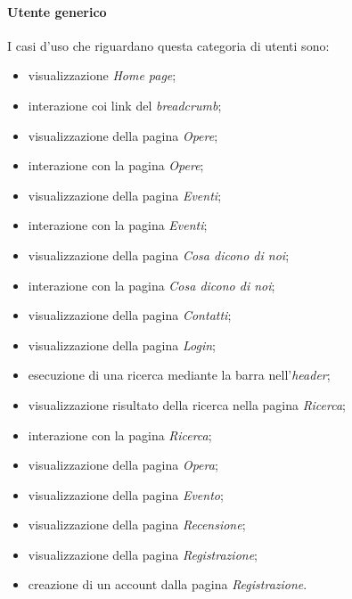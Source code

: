 \paragraph{Utente generico}
\label{analisi-casi-uso-attori-principali-utente-generico}
I casi d'uso che riguardano questa categoria di utenti sono:
\begin{itemize}
	\item visualizzazione \textit{Home page};
	\item interazione coi link del \textit{breadcrumb};
	\item visualizzazione della pagina \textit{Opere};
	\item interazione con la pagina \textit{Opere};
	\item visualizzazione della pagina \textit{Eventi};
	\item interazione con la pagina \textit{Eventi};
	\item visualizzazione della pagina \textit{Cosa dicono di noi};
	\item interazione con la pagina \textit{Cosa dicono di noi};
	\item visualizzazione della pagina \textit{Contatti};
	\item visualizzazione della pagina \textit{Login};
	\item esecuzione di una ricerca mediante la barra nell'\textit{header};
	\item visualizzazione risultato della ricerca nella pagina \textit{Ricerca};
	\item interazione con la pagina \textit{Ricerca};
	\item visualizzazione della pagina \textit{Opera};
	\item visualizzazione della pagina \textit{Evento};
	\item visualizzazione della pagina \textit{Recensione};
	\item visualizzazione della pagina \textit{Registrazione};
	\item creazione di un account dalla pagina \textit{Registrazione}.
\end{itemize}

